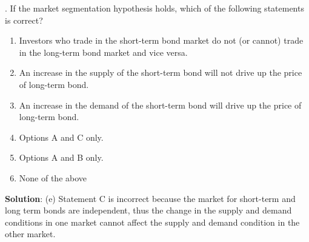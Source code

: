 \documentclass[11.5pt]{article}
\begin{document}
\newpage

. If the market segmentation hypothesis holds, which of the following statements is correct?

\begin{enumerate}[a]
	
	\item Investors who trade in the short-term bond market do not (or cannot) trade in the long-term bond market and vice versa.
	
	\item An increase in the supply of the short-term bond will not drive up the price of long-term bond.
	
	\item An increase in the demand of the short-term bond will drive up the price of long-term bond.
	
	\item Options A and C only.
	
	\item Options A and B only.
	
	\item None of the above
\end{enumerate}



\noindent \textbf{Solution}: (e)  Statement C is incorrect because the market for short-term and long term bonds are independent, thus the change in the supply and demand conditions in one market cannot affect the supply and demand condition in the other market.


\vspace{30pt}
\end{document}
